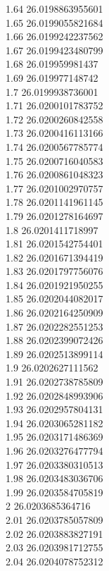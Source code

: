 {1.64	26.0198863955601\\
1.65	26.0199055821684\\
1.66	26.0199242237562\\
1.67	26.0199423480799\\
1.68	26.019959981437\\
1.69	26.019977148742\\
1.7	26.0199938736001\\
1.71	26.0200101783752\\
1.72	26.0200260842558\\
1.73	26.0200416113166\\
1.74	26.0200567785774\\
1.75	26.0200716040583\\
1.76	26.0200861048323\\
1.77	26.0201002970757\\
1.78	26.0201141961145\\
1.79	26.0201278164697\\
1.8	26.0201411718997\\
1.81	26.0201542754401\\
1.82	26.0201671394419\\
1.83	26.0201797756076\\
1.84	26.0201921950255\\
1.85	26.0202044082017\\
1.86	26.0202164250909\\
1.87	26.0202282551253\\
1.88	26.0202399072426\\
1.89	26.0202513899114\\
1.9	26.0202627111562\\
1.91	26.0202738785809\\
1.92	26.0202848993906\\
1.93	26.0202957804131\\
1.94	26.0203065281182\\
1.95	26.0203171486369\\
1.96	26.0203276477794\\
1.97	26.0203380310513\\
1.98	26.0203483036706\\
1.99	26.0203584705819\\
2	26.0203685364716\\
2.01	26.0203785057809\\
2.02	26.0203883827191\\
2.03	26.0203981712755\\
2.04	26.0204078752312\\
}
